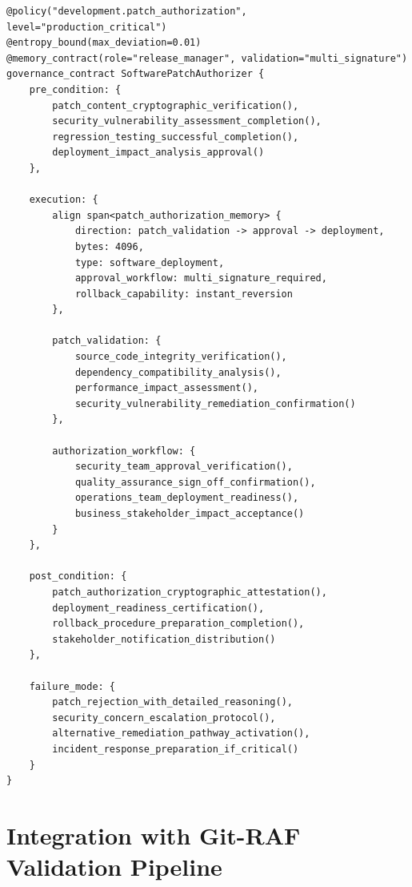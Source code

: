 \documentclass[11pt,letterpaper]{article}
\begin{document}
\begin{lstlisting}[language=rift, caption=Software Patch Authorization Contract]
@policy("development.patch_authorization", level="production_critical")
@entropy_bound(max_deviation=0.01)
@memory_contract(role="release_manager", validation="multi_signature")
governance_contract SoftwarePatchAuthorizer {
    pre_condition: {
        patch_content_cryptographic_verification(),
        security_vulnerability_assessment_completion(),
        regression_testing_successful_completion(),
        deployment_impact_analysis_approval()
    },
    
    execution: {
        align span<patch_authorization_memory> {
            direction: patch_validation -> approval -> deployment,
            bytes: 4096,
            type: software_deployment,
            approval_workflow: multi_signature_required,
            rollback_capability: instant_reversion
        },
        
        patch_validation: {
            source_code_integrity_verification(),
            dependency_compatibility_analysis(),
            performance_impact_assessment(),
            security_vulnerability_remediation_confirmation()
        },
        
        authorization_workflow: {
            security_team_approval_verification(),
            quality_assurance_sign_off_confirmation(),
            operations_team_deployment_readiness(),
            business_stakeholder_impact_acceptance()
        }
    },
    
    post_condition: {
        patch_authorization_cryptographic_attestation(),
        deployment_readiness_certification(),
        rollback_procedure_preparation_completion(),
        stakeholder_notification_distribution()
    },
    
    failure_mode: {
        patch_rejection_with_detailed_reasoning(),
        security_concern_escalation_protocol(),
        alternative_remediation_pathway_activation(),
        incident_response_preparation_if_critical()
    }
}
\end{lstlisting}

\section{Integration with Git-RAF Validation Pipeline}
\end{document}
